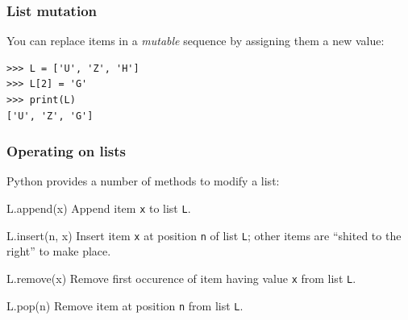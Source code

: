 \documentclass[english,serif,mathserif,xcolor=pdftex,dvipsnames,table]{beamer}
\begin{document}
\begin{frame}[fragile]
  \frametitle{List mutation}
  You can replace items in a \emph{mutable} sequence by assigning them
  a new value:
\begin{lstlisting}
>>> L = ['U', 'Z', 'H']
>>> L[2] = 'G'
>>> print(L)
['U', 'Z', 'G']
\end{lstlisting}


\end{frame}


\begin{frame}[fragile]
  \frametitle{Operating on lists}

  Python provides a number of methods to modify a list:

  \begin{describe}{L.append(x)}
    Append item \texttt{x} to list \texttt{L}.
  \end{describe}

  \begin{describe}{L.insert(n, x)}
    Insert item \texttt{x} at position \texttt{n} of list \texttt{L};
    other items are ``shited to the right'' to make place.
  \end{describe}

  \begin{describe}{L.remove(x)}
    Remove first occurence of item having value \texttt{x} from list \texttt{L}.
  \end{describe}

  \begin{describe}{L.pop(n)}
    Remove item at position \texttt{n} from list \texttt{L}.
  \end{describe}
\end{frame}
\end{document}
